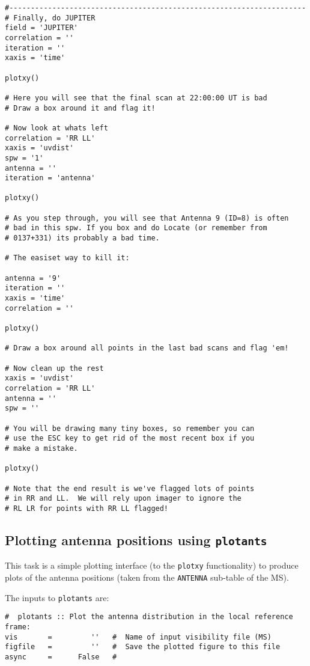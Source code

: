 \begin{verbatim}
#---------------------------------------------------------------------
# Finally, do JUPITER
field = 'JUPITER'
correlation = ''
iteration = ''
xaxis = 'time'

plotxy()

# Here you will see that the final scan at 22:00:00 UT is bad
# Draw a box around it and flag it!

# Now look at whats left
correlation = 'RR LL'
xaxis = 'uvdist'
spw = '1'
antenna = ''
iteration = 'antenna'

plotxy()

# As you step through, you will see that Antenna 9 (ID=8) is often 
# bad in this spw. If you box and do Locate (or remember from
# 0137+331) its probably a bad time.

# The easiset way to kill it:

antenna = '9'
iteration = ''
xaxis = 'time'
correlation = ''

plotxy()

# Draw a box around all points in the last bad scans and flag 'em!

# Now clean up the rest
xaxis = 'uvdist'
correlation = 'RR LL'
antenna = ''
spw = ''

# You will be drawing many tiny boxes, so remember you can
# use the ESC key to get rid of the most recent box if you
# make a mistake.

plotxy()

# Note that the end result is we've flagged lots of points
# in RR and LL.  We will rely upon imager to ignore the
# RL LR for points with RR LL flagged!

\end{verbatim}
\normalsize

\subsection{Plotting antenna positions using {\tt plotants}}
\label{section:edit.plot.plotants}

This task is a simple plotting interface (to the {\tt plotxy}
functionality) to produce plots of the antenna positions (taken from
the {\tt ANTENNA} sub-table of the MS).

The inputs to {\tt plotants} are:
\small
\begin{verbatim}
#  plotants :: Plot the antenna distribution in the local reference frame:
vis       =         ''   #  Name of input visibility file (MS)
figfile   =         ''   #  Save the plotted figure to this file
async     =      False   #  
\end{verbatim}
\normalsize

